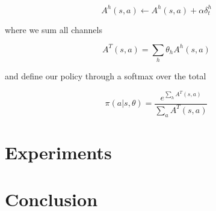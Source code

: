 \documentclass{article}
\begin{document}
\begin{equation}
  A^h(s,a) \leftarrow A^h(s,a) + \alpha \delta^h_t
\end{equation}

where we sum all channels

\begin{equation}
  A^T(s,a) = \sum_h \theta_h A^h(s,a)
\end{equation}

and define our policy through a softmax over the total

\begin{equation}
  \pi(a|s, \theta) = \frac{e^{\sum_h A^T(s,a)}}{\sum_a A^T(s,a)}
\end{equation}

\section{Experiments}

\section{Conclusion}

% 
% 
\end{document}

